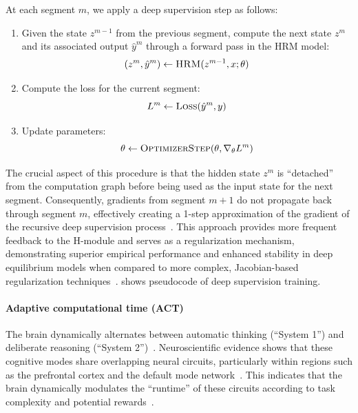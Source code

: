 At each segment $m$, we apply a deep supervision step as follows:
\begin{enumerate}
\vspace{-0.15in}
    \item Given the state $z^{m-1}$ from the previous segment, compute the next state $z^m$ and its associated output $\hat{y}^m$ through a forward pass in the HRM model:
    \begin{equation*}
    (z^m, \hat{y}^m) \leftarrow \textsc{HRM}(z^{m-1}, x; \theta)
    \end{equation*}
    \item Compute the loss for the current segment:
    \begin{equation*}
    L^m \leftarrow \textsc{Loss}(\hat{y}^m, y)
    \end{equation*}
    \item Update parameters:
    \begin{equation*}
    \theta \leftarrow \textsc{OptimizerStep}(\theta, \nabla_{\theta} L^m)
    \end{equation*}
\end{enumerate}
The crucial aspect of this procedure is that the hidden state $z^m$ is ``detached'' from the computation graph before being used as the input state for the next segment. Consequently, gradients from segment $m+1$ do not propagate back through segment $m$, effectively creating a 1-step approximation of the gradient of the recursive deep supervision process~\citep{DEQ-Flow, Ramzi2021SHINEST}. This approach provides more frequent feedback to the H-module and serves as a regularization mechanism, demonstrating superior empirical performance and enhanced stability in deep equilibrium models when compared to more complex, Jacobian-based regularization techniques~\citep{DEQ-Flow, Bai2021StabilizingEM}.  shows pseudocode of deep supervision training.

\paragraph{Adaptive computational time (ACT)}
The brain dynamically alternates between automatic thinking (``System 1'') and deliberate reasoning (``System 2'')~\citep{kahneman2011thinking}. Neuroscientific evidence shows that these cognitive modes share overlapping neural circuits, particularly within regions such as the prefrontal cortex and the default mode network~\citep{lieberman2007social,buckner2008brain}. This indicates that the brain dynamically modulates the ``runtime'' of these circuits according to task complexity and potential rewards~\citep{raichle2015brain,westbrook2015cognitive}.


